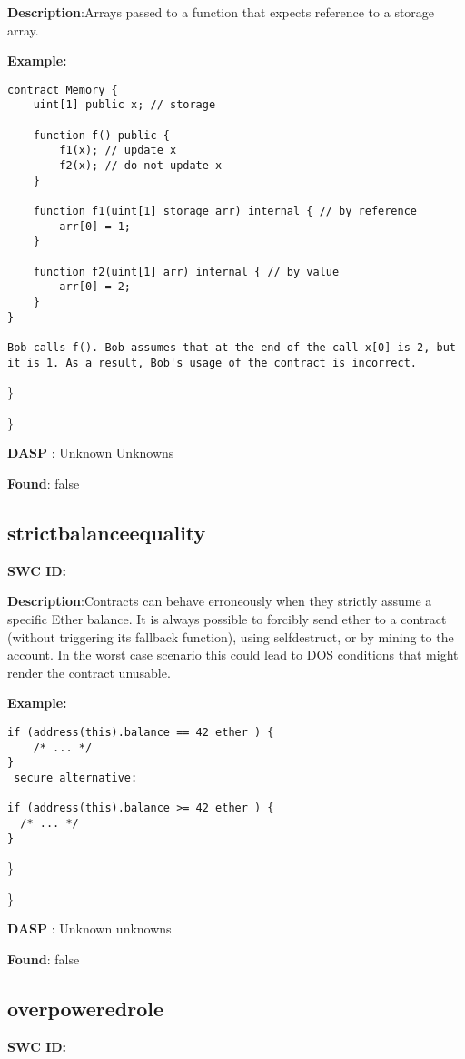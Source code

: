 \documentclass{article}
\begin{document}
\textbf{Description}:Arrays passed to a function that expects reference to a storage array.


\textbf{Example:} 
\begin{verbatim}
contract Memory {
    uint[1] public x; // storage

    function f() public {
        f1(x); // update x
        f2(x); // do not update x
    }

    function f1(uint[1] storage arr) internal { // by reference
        arr[0] = 1;
    }

    function f2(uint[1] arr) internal { // by value
        arr[0] = 2;
    }
}

Bob calls f(). Bob assumes that at the end of the call x[0] is 2, but it is 1. As a result, Bob's usage of the contract is incorrect.

\end{verbatim}\} 

\} 

\textbf{DASP} : Unknown Unknowns

\textbf{Found}: false

\subsection{strict\textunderscore balance\textunderscore equality} 
\textbf{SWC \textunderscore ID:} 

\textbf{Description}:Contracts can behave erroneously when they strictly assume a specific Ether balance. It is always possible to forcibly send ether to a contract (without triggering its fallback function), using selfdestruct, or by mining to the account. In the worst case scenario this could lead to DOS conditions that might render the contract unusable.


\textbf{Example:} 
\begin{verbatim}
if (address(this).balance == 42 ether ) {
    /* ... */
}
 secure alternative:

if (address(this).balance >= 42 ether ) {
  /* ... */
}

\end{verbatim}\} 

\} 

\textbf{DASP} : Unknown unknowns

\textbf{Found}: false

\subsection{overpowered\textunderscore role} 
\textbf{SWC \textunderscore ID:} 
\end{document}
